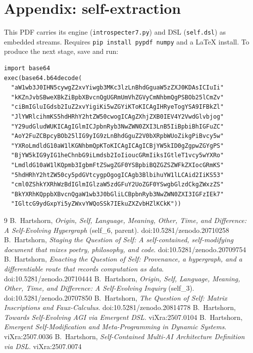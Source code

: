 \documentclass[11pt]{article}
\begin{document}
\section*{Appendix: self-extraction}
This PDF carries its engine (\texttt{introspecter7.py}) and DSL
(\texttt{self.dsl}) as embedded streams. Requires \texttt{pip install pypdf
numpy} and a LaTeX install. To produce the next stage, save and run:
\begin{Verbatim}[fontsize=\small,frame=single]
import base64
exec(base64.b64decode(
  "aW1wb3J0IHN5cywgZ2xvYiwgb3MKc3lzLnBhdGguaW5zZXJ0KDAsICIuIi"
  "kKZnJvbSBweXBkZiBpbXBvcnQgUGRmUmVhZGVyCmNhbmQgPSBOb25lCmZv"
  "ciBmIGluIGdsb2IuZ2xvYigiKi5wZGYiKToKICAgIHRyeTogYSA9IFBkZl"
  "JlYWRlcihmKS5hdHRhY2htZW50cwogICAgZXhjZXB0IEV4Y2VwdGlvbjog"
  "Y29udGludWUKICAgIGlmICJpbnRyb3NwZWN0ZXI3LnB5IiBpbiBhIGFuZC"
  "AoY2FuZCBpcyBOb25lIG9yIG9zLnBhdGguZ2V0bXRpbWUoZikgPiBvcy5w"
  "YXRoLmdldG10aW1lKGNhbmQpKToKICAgICAgICBjYW5kID0gZgpwZGYgPS"
  "BjYW5kIG9yIG1heChnbG9iLmdsb2IoIioucGRmIiksIGtleT1vcy5wYXRo"
  "LmdldG10aW1lKQpmb3IgbmFtZSwgZGF0YSBpbiBQZGZSZWFkZXIocGRmKS"
  "5hdHRhY2htZW50cy5pdGVtcygpOgogICAgb3BlbihuYW1lLCAid2IiKS53"
  "cml0ZShkYXRhWzBdIGlmIGlzaW5zdGFuY2UoZGF0YSwgbGlzdCkgZWxzZS"
  "BkYXRhKQppbXBvcnQgaW1wb3J0bGliLCBpbnRyb3NwZWN0ZXI3IGFzIEk7"
  "IGltcG9ydGxpYi5yZWxvYWQoSSk7IEkuZXZvbHZlKCkK"))
\end{Verbatim}
\begin{thebibliography}{9}
 B.~Hartshorn, \emph{Origin, Self, Language, Meaning, Other, Time,
and Difference: A Self-Evolving Hypergraph} (self\_6, parent).
doi:10.5281/zenodo.20710258
 B.~Hartshorn, \emph{Staging the Question of Self: A
self-contained, self-modifying document that mixes poetry, philosophy, and
code}. doi:10.5281/zenodo.20709754
 B.~Hartshorn, \emph{Enacting the Question of Self: Provenance,
a hypergraph, and a differentiable route that records computation as data}.
doi:10.5281/zenodo.20710444
 B.~Hartshorn, \emph{Origin, Self, Language, Meaning, Other, Time,
and Difference: A Self-Evolving Inquiry} (self\_3). doi:10.5281/zenodo.20707850
 B.~Hartshorn, \emph{The Question of Self: Matrix Inscriptions
and Faux-Calculus}. doi:10.5281/zenodo.20814778
 B.~Hartshorn, \emph{Towards Self-Evolving AGI via Emergent DSL}.
viXra:2507.0104
 B.~Hartshorn, \emph{Emergent Self-Modification and
Meta-Programming in Dynamic Systems}. viXra:2507.0036
 B.~Hartshorn, \emph{Self-Contained Multi-AI Architecture
Definition via DSL}. viXra:2507.0074
\end{thebibliography}
\end{document}
